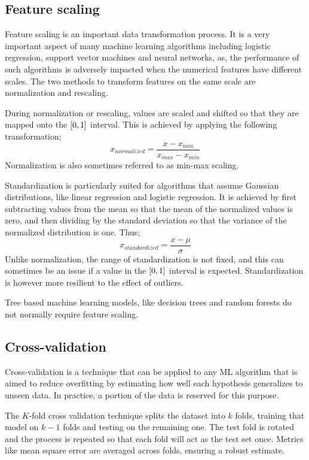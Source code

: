 
	\subsection{Feature scaling}

		Feature scaling is an important data transformation process. It is a very important aspect of many machine learning algorithms including logistic regression, support vector machines and neural networks, as, the performance of such algorithms is adversely impacted when the numerical features have different scales. The two methods to transform features on the same scale are normalization and rescaling.
		
		During normalization or rescaling, values are scaled and shifted so that they are mapped onto the $[0,\space 1]$ interval. This is achieved by applying the following transformation;
		$$
		x_{normalized} = \frac{x - x_{min}}{x_{max}-x_{min}}
		$$
		Normalization is also sometimes referred to as min-max scaling.
		
		Standardization is particularly suited for algorithms that assume Gaussian distributions, like linear regression and logistic regression. It is achieved by first subtracting values from the mean so that the mean of the normalized values is zero, and then dividing by the standard deviation so that the variance of the normalized distribution is one. Thus;
		$$
		x_{standardized} = \frac{x - \mu}{\sigma}
		$$
		Unlike normalization, the range of standardization is not fixed, and this can sometimes be an issue if a value in the $[0,\space 1]$ interval is expected.  Standardization is however more resilient to the effect of outliers.
		
		Tree based machine learning models, like decision trees and random forests do not normally require feature scaling.


	
	\subsection{Cross-validation}
	
		Cross-validation is a technique that can be applied to any ML algorithm that is aimed to reduce overfitting by estimating how well each hypothesis generalizes to unseen data. In practice, a portion of the data is reserved for this purpose.
		
		The $K$-fold cross validation technique splits the dataset into $k$ folds, training that model on $k-1$ folds and testing on the remaining one. The test fold is rotated and the process is repeated so that each fold will act as the test set once. Metrics like mean square error are averaged across folds, ensuring a robust estimate.
		
